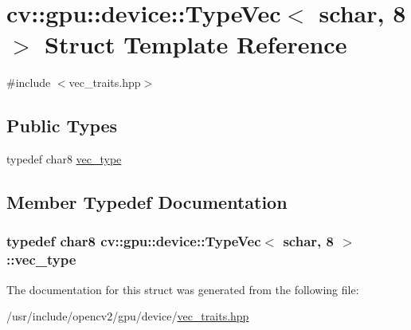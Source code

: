 \hypertarget{structcv_1_1gpu_1_1device_1_1TypeVec_3_01schar_00_018_01_4}{\section{cv\-:\-:gpu\-:\-:device\-:\-:Type\-Vec$<$ schar, 8 $>$ Struct Template Reference}
\label{structcv_1_1gpu_1_1device_1_1TypeVec_3_01schar_00_018_01_4}
}


{\ttfamily \#include $<$vec\-\_\-traits.\-hpp$>$}

\subsection*{Public Types}
\begin{DoxyCompactItemize}
\item 
typedef char8 \hyperlink{structcv_1_1gpu_1_1device_1_1TypeVec_3_01schar_00_018_01_4_afdfbf1d9f169a728f384e07cdbf54841}{vec\-\_\-type}
\end{DoxyCompactItemize}


\subsection{Member Typedef Documentation}
\hypertarget{structcv_1_1gpu_1_1device_1_1TypeVec_3_01schar_00_018_01_4_afdfbf1d9f169a728f384e07cdbf54841}{
\subsubsection[{vec\-\_\-type}]{\setlength{\rightskip}{0pt plus 5cm}typedef char8 {\bf cv\-::gpu\-::device\-::\-Type\-Vec}$<$ {\bf schar}, 8 $>$\-::{\bf vec\-\_\-type}}}\label{structcv_1_1gpu_1_1device_1_1TypeVec_3_01schar_00_018_01_4_afdfbf1d9f169a728f384e07cdbf54841}


The documentation for this struct was generated from the following file\-:\begin{DoxyCompactItemize}
\item 
/usr/include/opencv2/gpu/device/\hyperlink{vec__traits_8hpp}{vec\-\_\-traits.\-hpp}\end{DoxyCompactItemize}

